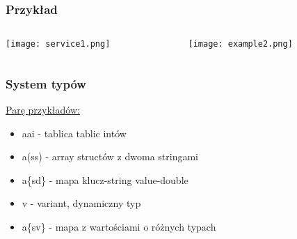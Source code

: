 \begin{frame}
    \frametitle{Przykład}
    \begin{columns}
    \begin{column}{0.5\textwidth}
        \begin{center}
            \texttt{[image: service1.png]}
        \end{center}
    \end{column}
    \begin{column}{0.5\textwidth}
        \begin{center}
            \texttt{[image: example2.png]}        
        \end{center}
    \end{column}
\end{columns}
\end{frame}


\begin{frame}
    \frametitle{System typów}
    \href{https://dbus.freedesktop.org/doc/dbus-specification.html}{Parę przykładów:}
    \begin{itemize}
        \item aai - tablica tablic intów
        \item a(ss) - array structów z dwoma stringami
        \item a\{sd\} - mapa klucz-string value-double
        \item v - variant, dynamiczny typ
        \item a\{sv\} - mapa z wartościami o różnych typach
    \end{itemize}
\end{frame}





